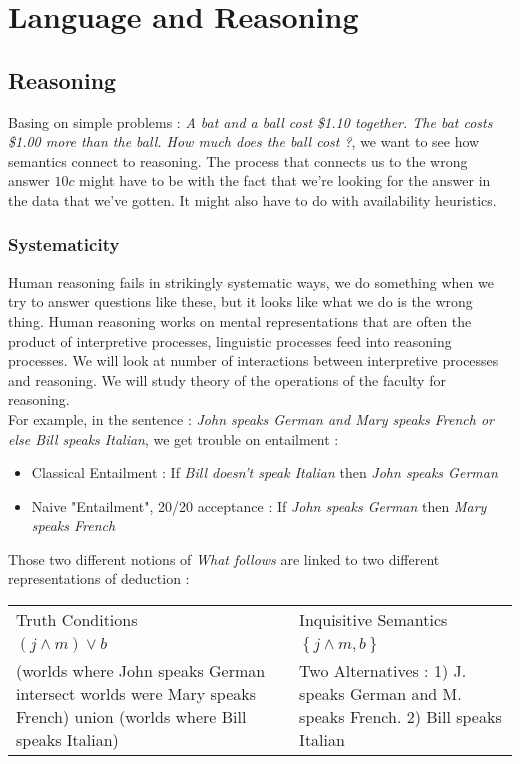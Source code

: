 \documentclass{cours}
\begin{document}
\section[Class 9\! : 07/12]{Language and Reasoning}
\subsection{Reasoning}
Basing on simple problems\! : \textsl{A bat and a ball cost \$1.10 together. The bat costs \$1.00 more than the ball. How much does the ball cost ?}, we want to see how semantics connect to reasoning. The process that connects us to the wrong answer $10c$ might have to be with the fact that we're looking for the answer in the data that we've gotten. It might also have to do with availability heuristics.
\subsubsection{Systematicity}
Human reasoning fails in strikingly systematic ways, we do something when we try to answer questions like these, but it looks like what we do is the wrong thing. Human reasoning works on mental representations that are often the product of interpretive processes, linguistic processes feed into reasoning processes. We will look at number of interactions between interpretive processes and reasoning. We will study theory of the operations of the faculty for reasoning. \\
For example, in the sentence\! : \textsl{John speaks German and Mary speaks French or else Bill speaks Italian}, we get trouble on entailment\! :
\begin{itemize}
    \item Classical Entailment\! : If \textsl{Bill doesn't speak Italian} then \textsl{John speaks German}
    \item Naive "Entailment", 20/20 acceptance\! : If \textsl{John speaks German} then \textsl{Mary speaks French}
\end{itemize}
Those two different notions of \textit{What follows} are linked to two different representations of deduction\! :
\begin{center}
    \begin{tabular}{p{}p{}}
        Truth Conditions                                                                                                    & Inquisitive Semantics                                                                 \\
        $(j \wedge m) \lor b$                                                                                               & $\left\{j \land m, b\right\}$                                                         \\
        (worlds where John speaks German intersect worlds were Mary speaks French) union (worlds where Bill speaks Italian) & Two Alternatives\! : 1) J. speaks German and M. speaks French. 2) Bill speaks Italian
    \end{tabular}
\end{center}
\end{document}
